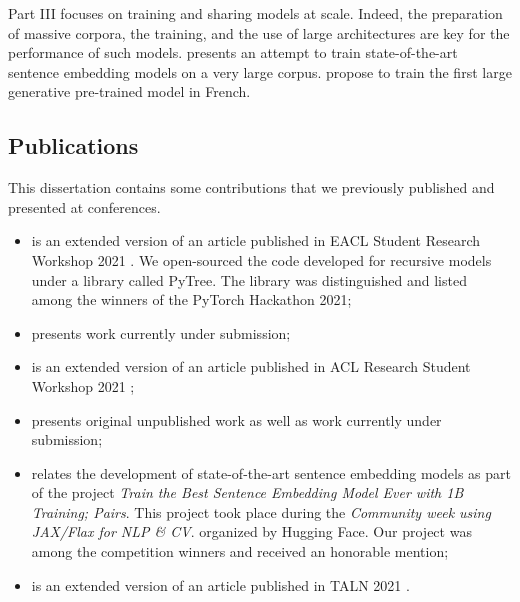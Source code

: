 Part III focuses on training and sharing models at scale. Indeed, the preparation of massive corpora, the training, and the use of large architectures are key for the performance of such models.  presents an attempt to train state-of-the-art sentence embedding models on a very large corpus.  propose to train the first large generative pre-trained model in French.

\subsection{Publications}

This dissertation contains some contributions that we previously published and presented at conferences.

\begin{itemize}
    \item {} is an extended version of an article published in EACL Student Research Workshop 2021 \parencite{simoulin_2021a}. We  open-sourced the code developed for recursive models under a library called PyTree. The library was distinguished and listed among the winners of the PyTorch Hackathon 2021;
    \item {} presents work currently under submission;
    \item {} is an extended version of an article published in ACL Research Student Workshop 2021 \parencite{simoulin_2021b};
    \item {} presents original unpublished work as well as work currently under submission;
    \item {} relates the development of state-of-the-art sentence embedding models as part of the project \textit{Train the Best Sentence Embedding Model Ever with 1B Training; Pairs}. This project took place during the \textit{Community week using JAX/Flax for NLP \& CV}. organized by Hugging Face. Our project was among the competition winners and received an honorable mention;
    \item {} is an extended version of an article published in TALN 2021 \parencite{simoulin_2021c}.
\end{itemize}


